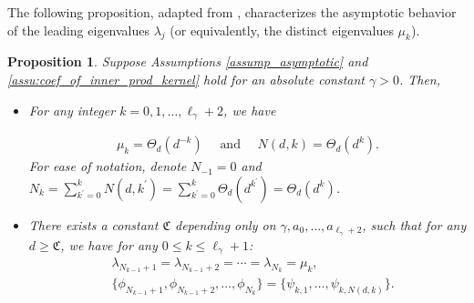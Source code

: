 \documentclass{article}
\theoremstyle{plain}
\newtheorem{proposition}[theorem]{Proposition}
\theoremstyle{definition}
\theoremstyle{remark}
\begin{document}
The following proposition, adapted from \cite{lu2024pinsker}, characterizes the asymptotic behavior of the leading eigenvalues $\lambda_j$ (or equivalently, the distinct eigenvalues $\mu_k$).


\begin{proposition}\label{prop:inner_edr}
    Suppose Assumptions 
\ref{assump_asymptotic} and 
\ref{assu:coef_of_inner_prod_kernel}  hold for an absolute constant $\gamma>0$.
    Then,
\begin{itemize}
    \item For any integer $k  = 0, 1, \ldots, \ell_{\gamma} +2$, we have

\begin{equation*}
\begin{aligned}
 \mu_{k} = \Theta_d( d^{-k}) \quad \text{ and } \quad
N(d, k) = \Theta_d( d^k ).
\end{aligned}
\end{equation*}
For ease of notation, denote
$N_{-1}=0$ and $N_{k} = \sum_{k^{\prime}=0}^{k}N(d, k^{\prime}) = \sum_{k^{\prime}=0}^{k}\Theta_d(d^{k^{\prime}}) = \Theta_d(d^k)$. 


\item There exists a constant \( \mathfrak{C} \) depending only on \( \gamma, a_0, \ldots, a_{\ell_{\gamma} + 2} \), such that for any \( d \geq \mathfrak{C} \), we have for any $0 \leq k \leq \ell_{\gamma}+1$: 
    \begin{align*}
    &  \lambda_{N_{k-1}+1} = \lambda_{N_{k-1}+2}= \cdots=\lambda_{N_{k}} = \mu_k,\\
     &  \{ 
         \phi_{N_{k-1}+1}, \phi_{N_{k-1}+2}, \ldots, \phi_{N_{k}}\} =\{\psi_{k,1}, \ldots, \psi_{k,N(d,k)}\}.
    \end{align*}
\end{itemize}
\end{proposition}
\end{document}

